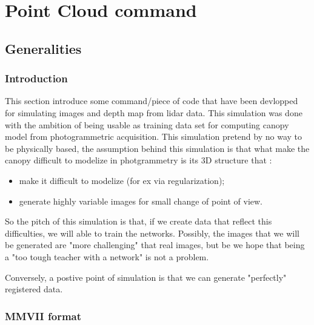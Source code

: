 \chapter{Point Cloud command}
\label{Chap:PointCloud}



\section{Generalities}

\subsection{Introduction}

This section introduce some command/piece of code that have been devlopped for simulating
images and depth map from lidar data.  This simulation was done with the ambition of being usable as
training data set for computing canopy model from photogrammetric acquisition. This
simulation pretend by no way to be physically based, the assumption behind this simulation
is that what make the canopy difficult to modelize in photgrammetry is its 3D structure that :

\begin{itemize}
   \item make it difficult to modelize (for ex via regularization);
   \item generate highly variable images for small change of point of view.
\end{itemize}


So the pitch of this simulation is that, if we create data that reflect this difficulties, 
we will able to train the networks.  Possibly, the images that we will be generated are "more
challenging" that  real images, but be we hope that being a "too tough teacher with a network" is not a problem.

Conversely, a postive point of simulation is that we can generate "perfectly" registered data.



\subsection{MMVII format}

